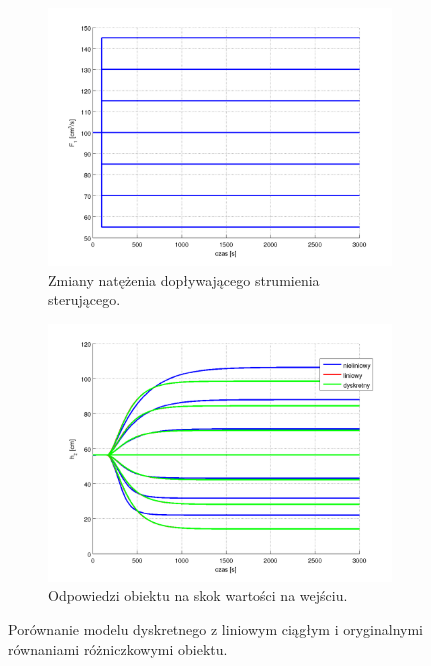 \documentclass[a4paper,12pt]{article}
\begin{document}
\begin{figure}[h]
   \centering
   \begin{subfigure}[h]{0.45\textwidth}
      \includegraphics[width=\textwidth]{img/symulacja_z_dyskretnym_1a.png}
      \caption{Zmiany natężenia dopływającego strumienia sterującego.}
   \end{subfigure}
   \begin{subfigure}[h]{0.45\textwidth}
      \includegraphics[width=\textwidth]{img/symulacja_z_dyskretnym_1b.png}
      \caption{Odpowiedzi obiektu na skok wartości na wejściu.}
   \end{subfigure}
   \caption{Porównanie modelu dyskretnego z liniowym ciągłym i oryginalnymi równaniami różniczkowymi obiektu.}
   \label{img:symulacja_z_dyskretnym}
\end{figure}
\end{document}
